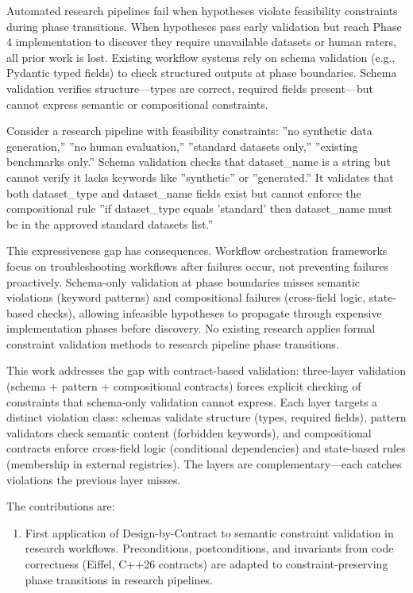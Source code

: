
Automated research pipelines fail when hypotheses violate feasibility constraints during phase transitions. When hypotheses pass early validation but reach Phase 4 implementation to discover they require unavailable datasets or human raters, all prior work is lost. Existing workflow systems rely on schema validation (e.g., Pydantic typed fields) to check structured outputs at phase boundaries. Schema validation verifies structure---types are correct, required fields present---but cannot express semantic or compositional constraints.

Consider a research pipeline with feasibility constraints: ''no synthetic data generation,'' ''no human evaluation,'' ''standard datasets only,'' ''existing benchmarks only.'' Schema validation checks that dataset\_name is a string but cannot verify it lacks keywords like ''synthetic'' or ''generated.'' It validates that both dataset\_type and dataset\_name fields exist but cannot enforce the compositional rule ''if dataset\_type equals 'standard' then dataset\_name must be in the approved standard datasets list.''

This expressiveness gap has consequences. Workflow orchestration frameworks focus on troubleshooting workflows after failures occur, not preventing failures proactively. Schema-only validation at phase boundaries misses semantic violations (keyword patterns) and compositional failures (cross-field logic, state-based checks), allowing infeasible hypotheses to propagate through expensive implementation phases before discovery. No existing research applies formal constraint validation methods to research pipeline phase transitions.

This work addresses the gap with contract-based validation: three-layer validation (schema + pattern + compositional contracts) forces explicit checking of constraints that schema-only validation cannot express. Each layer targets a distinct violation class: schemas validate structure (types, required fields), pattern validators check semantic content (forbidden keywords), and compositional contracts enforce cross-field logic (conditional dependencies) and state-based rules (membership in external registries). The layers are complementary---each catches violations the previous layer misses.

The contributions are:

\begin{enumerate}
\item First application of Design-by-Contract to semantic constraint validation in research workflows. Preconditions, postconditions, and invariants from code correctness (Eiffel, C++26 contracts) are adapted to constraint-preserving phase transitions in research pipelines.
\end{enumerate}

